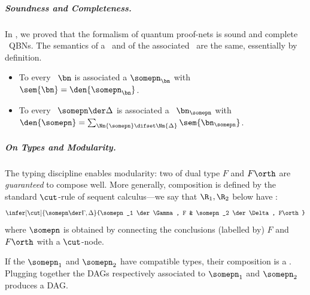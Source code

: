 \subparagraph{Soundness and Completeness.}

In , we proved that the formalism of quantum proof-nets is sound and complete \wrt\ QBNs.
The semantics of a \qbpn\ and of the associated \qqbn\ are the same, essentially by definition.

\begin{theorem}
\label{th:sem_coherence}
\hfill
\begin{itemize}
\item
To every \qqbn\ $\bn$ is associated a \good \qbpn $\somepn_\bn$ with $\sem{\bn} = \den{\somepn_{\bn}}$.
\item
To every \emph{\good} \qbpn\ $\somepn\der \Delta$ is associated a \qqbn\ $\bn_{\somepn}$ with $\den{\somepn} = \sum_{\Nm{\somepn} \difset \Nm{\Delta}}\sem {\bn_\somepn}$.
\end{itemize}
\end{theorem}

%

\subparagraph{On Types and Modularity.}

The typing discipline enables modularity: two \qbpns of dual type $F$ and $F\orth$ are \emph{guaranteed} to compose well.
More generally, composition is defined by the standard $\cut$-rule of sequent calculus---we say that $\R_1,\R_2$ below have :
\begin{equation*}
\infer[\cut]{\somepn\der \Gamma,\Delta}{\somepn_1 \der \Gamma, F & \somepn_2 \der \Delta, F\orth}
\end{equation*}
where $\somepn$ is obtained by connecting the conclusions (labelled by) $F$ and $F\orth$ with a $\cut$-node.

\begin{proposition}
\label{th:types}
If the \qbpns $\somepn_1$ and $\somepn_2$ have compatible types, their composition is a \qbpn.
Plugging together the DAGs respectively associated to $\somepn_1$ and $\somepn_2$ produces a DAG.
\end{proposition}

